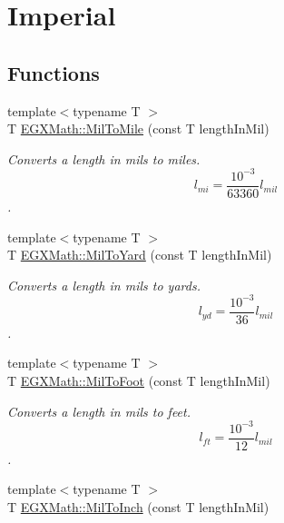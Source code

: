 \hypertarget{group___e_g_x_math-_conversions-_length_conversions-_imperial-_mil-_imperial}{}\section{Imperial}
\label{group___e_g_x_math-_conversions-_length_conversions-_imperial-_mil-_imperial}
\subsection*{Functions}
\begin{DoxyCompactItemize}
\item 
{\footnotesize template$<$typename T $>$ }\\T \mbox{\hyperlink{group___e_g_x_math-_conversions-_length_conversions-_imperial-_mil-_imperial_ga297cf60ff93d053d0fc2f6536b2b5681}{E\+G\+X\+Math\+::\+Mil\+To\+Mile}} (const T length\+In\+Mil)
\begin{DoxyCompactList}\small\item\em Converts a length in mils to miles. \[ l_{mi}=\frac{10^{-3}}{63360} l_{mil} \]. \end{DoxyCompactList}\item 
{\footnotesize template$<$typename T $>$ }\\T \mbox{\hyperlink{group___e_g_x_math-_conversions-_length_conversions-_imperial-_mil-_imperial_gade02edc43d3b604eead1bd825063df51}{E\+G\+X\+Math\+::\+Mil\+To\+Yard}} (const T length\+In\+Mil)
\begin{DoxyCompactList}\small\item\em Converts a length in mils to yards. \[ l_{yd}= \frac{10^{-3}}{36} l_{mil} \]. \end{DoxyCompactList}\item 
{\footnotesize template$<$typename T $>$ }\\T \mbox{\hyperlink{group___e_g_x_math-_conversions-_length_conversions-_imperial-_mil-_imperial_ga713e0647ca6e88ca4700e36c896fd276}{E\+G\+X\+Math\+::\+Mil\+To\+Foot}} (const T length\+In\+Mil)
\begin{DoxyCompactList}\small\item\em Converts a length in mils to feet. \[ l_{ft}= \frac{10^{-3}}{12} l_{mil} \]. \end{DoxyCompactList}\item 
{\footnotesize template$<$typename T $>$ }\\T \mbox{\hyperlink{group___e_g_x_math-_conversions-_length_conversions-_imperial-_mil-_imperial_ga70cc1592b6255e3d14562f09f4b9ab02}{E\+G\+X\+Math\+::\+Mil\+To\+Inch}} (const T length\+In\+Mil)

\end{DoxyCompactItemize}
